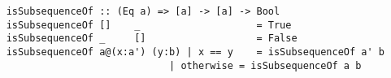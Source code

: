 \begin{verbatim}
    isSubsequenceOf :: (Eq a) => [a] -> [a] -> Bool
    isSubsequenceOf []    _                    = True
    isSubsequenceOf _     []                   = False
    isSubsequenceOf a@(x:a') (y:b) | x == y    = isSubsequenceOf a' b
                                | otherwise = isSubsequenceOf a b
\end{verbatim}
